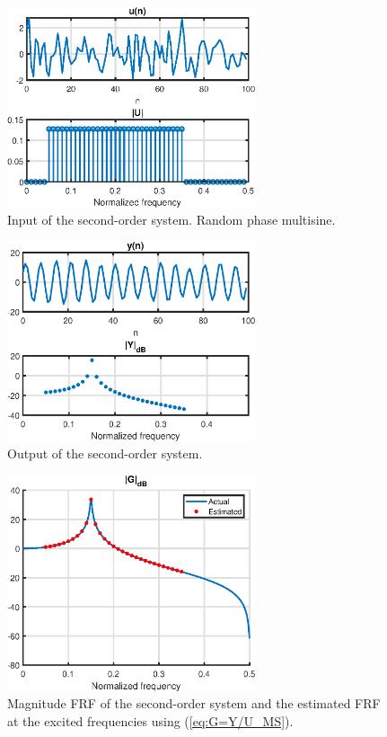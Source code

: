 \begin{figure}[H]
    \centering
    \includegraphics[width=0.65\textwidth]{figures/MS_u.eps}
    \caption{Input of the second-order system. Random phase multisine.}
    \label{fig:MS_u}
\end{figure}

\begin{figure}[H]
    \centering
    \includegraphics[width=0.65\textwidth]{figures/MS_y.eps}
    \caption{Output of the second-order system.}
    \label{fig:MS_y}
\end{figure}

\begin{figure}[H]
    \centering
    \includegraphics[width=0.65\textwidth]{figures/MS_G.eps}
    \caption{Magnitude FRF of the second-order system and the estimated FRF at the excited frequencies using (\ref{eq:G=Y/U_MS}).}
    \label{fig:MS_G}
\end{figure}

